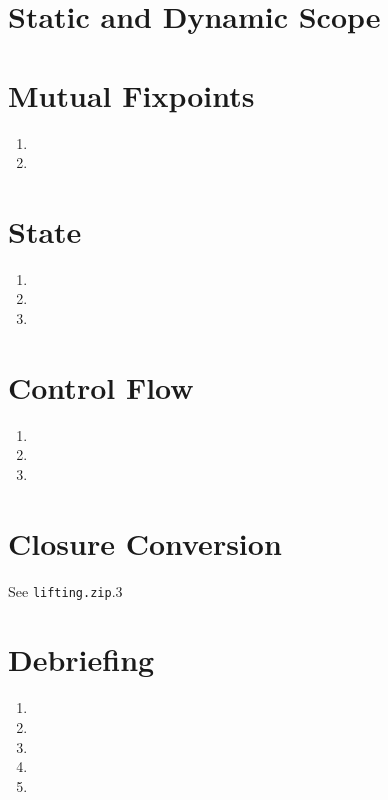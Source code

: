\documentclass[10pt]{article}
\begin{document}
\section{Static and Dynamic Scope}%
\section{Mutual Fixpoints}%
\begin{enumerate}
    \item
    \item
\end{enumerate}
\section{State}%
\begin{enumerate}
    \item
    \item
    \item
\end{enumerate}
\section{Control Flow}%
\begin{enumerate}
    \item
    \item
    \item
\end{enumerate}
\section{Closure Conversion}%
See \texttt{lifting.zip}.3
\section{Debriefing}%
\begin{enumerate}
    \item
    \item
    \item
    \item
    \item
\end{enumerate}
\end{document}
